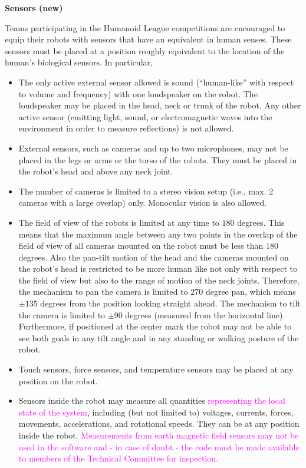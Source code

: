 {\bfseries Sensors (new)}

\headlinebox

Teams participating in the Humanoid League competitions are encouraged to equip their robots with sensors that have an equivalent in human senses. These sensors must be placed at a position roughly equivalent to the location of the human{\textquoteright}s biological sensors. In particular, 

\begin{itemize}
\item The only active external sensor allowed is sound
(``human-like'' with respect to volume and frequency) with one loudspeaker on the robot. The loudspeaker may be placed in the head, neck or trunk of the robot. Any
other active sensor (emitting light, sound, or electromagnetic waves into the environment in order to measure reflections) is not allowed. 
\item External sensors, such as cameras and up to two microphones, may not be placed in the legs or arms or the
torso of the robots. They must be placed in the robot's
head and above any neck joint. 
\item The number of cameras is limited to a stereo vision setup (i.e., max. 2 cameras with a large overlap) only. Monocular vision is also allowed.
\item The field of view of the robots is limited at any time to $180$ degrees. This means that the maximum angle between any two points in the overlap of the field of view of all cameras mounted on the robot must be less than $180$ degrees. Also the pan-tilt motion of the head and the cameras mounted on the robot's head is restricted to be more human like not only with respect to the field of view but also to the range of motion of the neck joints. Therefore, the mechanism to pan the camera is limited to $270$ degree pan, which means $\pm135$ degrees from the position looking straight ahead. The mechanism to tilt the camera is limited to $\pm90$ degrees (measured from the horizontal line). Furthermore, if positioned at the center mark the robot may not be able to see both goals in any tilt angle and in any standing or walking posture of the robot. 
\item Touch sensors, force sensors, and temperature sensors may be placed at any position on the robot.
\item Sensors inside the robot may measure all quantities \textcolor{magenta}{representing the local state of the system}, including (but not limited to) voltages, currents, forces, movements, accelerations, and rotational speeds. They can be at any position inside the robot. \textcolor{magenta}{Measurements from earth magnetic field sensors may not be used in the software and - in case of doubt - the code must be made available to members of the Technical Committee for inspection.}
\end{itemize}

